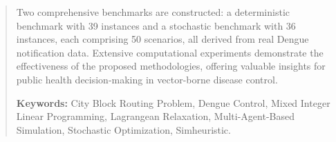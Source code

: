 \documentclass[Ingles]{ic-tese-v3}
\begin{document}
\begin{abstract}
	Two comprehensive benchmarks are constructed: a deterministic benchmark with 39
	instances and a stochastic benchmark with 36 instances, each comprising 50
	scenarios, all derived from real Dengue notification data. Extensive
	computational experiments demonstrate the effectiveness of the proposed
	methodologies, offering valuable insights for public health decision-making in
	vector-borne disease control.

	\textbf{Keywords:} City Block Routing Problem, Dengue Control, Mixed Integer
	Linear Programming, Lagrangean Relaxation, Multi-Agent-Based Simulation,
	Stochastic Optimization, Simheuristic.
\end{abstract}




\listoffigures

\listoftables

\printglossary[type=\acronymtype]




\tableofcontents


\fimdaspaginasiniciais














\end{document}
